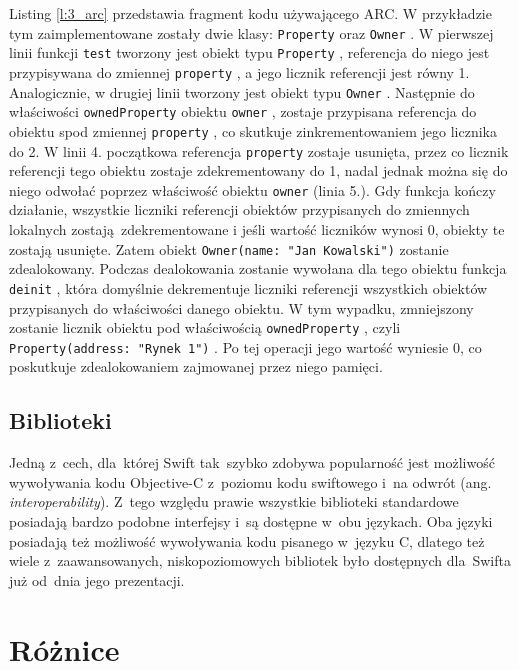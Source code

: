\documentclass[mgr, shortabstract]{iithesis}
\newcommand{\ang}[1]{ang. \textit{#1}}
\newcommand{\swiftinline}[1]{
    \texttt{#1}
}
\begin{document}
Listing \ref{l:3_arc} przedstawia fragment kodu używającego ARC. W przykładzie tym zaimplementowane zostały dwie klasy: \swiftinline{Property} oraz \swiftinline{Owner}. W pierwszej linii funkcji \swiftinline{test} tworzony jest obiekt typu \swiftinline{Property}, referencja do niego jest przypisywana do zmiennej \swiftinline{property}, a jego licznik referencji jest równy 1. Analogicznie, w drugiej linii tworzony jest obiekt typu \swiftinline{Owner}. Następnie do właściwości \swiftinline{ownedProperty} obiektu \swiftinline{owner}, zostaje przypisana referencja do obiektu spod zmiennej \swiftinline{property}, co skutkuje zinkrementowaniem jego licznika do 2. W linii 4. początkowa referencja \swiftinline{property} zostaje usunięta, przez co licznik referencji tego obiektu zostaje zdekrementowany do 1, nadal jednak można się do niego odwołać poprzez właściwość obiektu \swiftinline{owner} (linia 5.). Gdy funkcja kończy działanie, wszystkie liczniki referencji obiektów przypisanych do zmiennych lokalnych zostają zdekrementowane i jeśli wartość liczników wynosi 0, obiekty te zostają usunięte. Zatem obiekt \swiftinline{Owner(name: "Jan Kowalski")} zostanie zdealokowany. Podczas dealokowania zostanie wywołana dla tego obiektu funkcja \swiftinline{deinit}, która domyślnie dekrementuje liczniki referencji wszystkich obiektów przypisanych do właściwości danego obiektu. W tym wypadku, zmniejszony zostanie licznik obiektu pod właściwością \swiftinline{ownedProperty}, czyli \swiftinline{Property(address: "Rynek 1")}. Po tej operacji jego wartość wyniesie 0, co poskutkuje zdealokowaniem zajmowanej przez niego pamięci.

\subsection{Biblioteki}

Jedną z~cech, dla~której Swift tak~szybko zdobywa popularność jest możliwość wywoływania kodu Objective-C z~poziomu kodu swiftowego i~na odwrót (\ang{interoperability}). Z~tego względu prawie wszystkie biblioteki standardowe posiadają bardzo podobne interfejsy i~są dostępne w~obu językach. Oba języki posiadają też możliwość wywoływania kodu pisanego w~języku C, dlatego też wiele z~zaawansowanych, niskopoziomowych bibliotek było dostępnych dla~Swifta już od~dnia jego prezentacji.

\section{Różnice}
\end{document}
